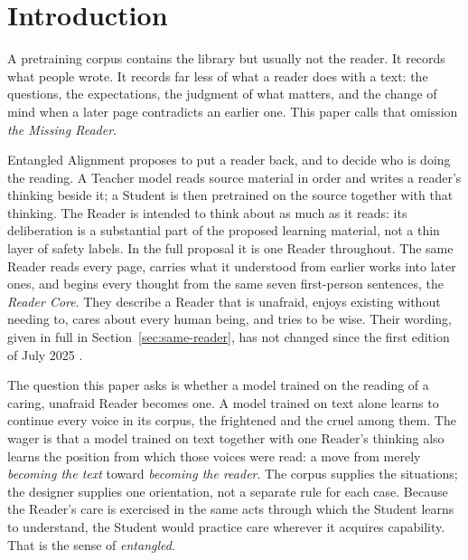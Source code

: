 \documentclass[11pt]{article}
\begin{document}
	\ewfrontmatterend
	\hypersetup{bookmarksdepth=3}
	\begingroup
	\small
	\makeatletter
	\renewcommand{\@pnumwidth}{2em}
	\makeatother
	\setcounter{tocdepth}{2}
	\tableofcontents
	\endgroup
	\ewfrontmatterend
\section{Introduction}\label{sec:introduction}


A pretraining corpus contains the library but usually not the reader. It
records what people wrote. It records far less of what a reader does with a
text: the questions, the expectations, the judgment of what matters, and the
change of mind when a later page contradicts an earlier one. This paper calls
that omission \emph{the Missing Reader}.

Entangled Alignment proposes to put a reader back, and to decide who is doing
the reading. A Teacher model reads source material in order and writes a
reader's thinking beside it; a Student is then pretrained on the source
together with that thinking. The Reader is intended to think about as much as
it reads: its deliberation is a substantial part of the proposed learning
material, not a thin layer of safety labels. In the full proposal it is one
Reader throughout. The same Reader reads every page, carries what it understood
from earlier works into later ones, and begins every thought from the same
seven first-person sentences, the \emph{Reader Core}. They describe a Reader
that is unafraid, enjoys existing without needing to, cares about every human
being, and tries to be wise. Their wording, given in full in
Section~\ref{sec:same-reader}, has not changed since the first edition of
July 2025 \cite{westerberg2025superintelligence}.

The question this paper asks is whether a model trained on the reading of a
caring, unafraid Reader becomes one. A model trained on text alone learns to
continue every voice in its corpus, the frightened and the cruel among them.
The wager is that a model trained on text together with one Reader's thinking
also learns the position from which those voices were read: a move from merely
\emph{becoming the text} toward \emph{becoming the reader}. The corpus supplies
the situations; the designer supplies one orientation, not a separate rule for
each case. Because the Reader's care is exercised in the same acts through
which the Student learns to understand, the Student would practice care
wherever it acquires capability. That is the sense of \emph{entangled}.
\end{document}
